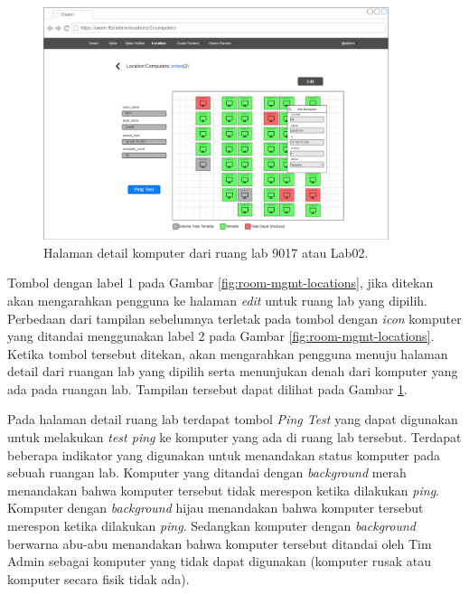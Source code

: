 \documentclass[a4paper,twoside]{article}
\begin{document}
\begin{enumerate}
\begin{itemize}
\begin{itemize}
                
                 \begin{figure}[ht]
                    \centering
                    \includegraphics[width=0.9\textwidth]{images/ui designs/room-management/location-id2.png}
                    \caption{Halaman detail komputer dari ruang lab 9017 atau Lab02.}
                    \label{fig:room-mgmt-detail-computers}
                \end{figure}
                
                 Tombol dengan label 1 pada Gambar \ref{fig:room-mgmt-locations}, jika ditekan akan mengarahkan pengguna ke halaman \textit{edit} untuk ruang lab yang dipilih. Perbedaan dari tampilan sebelumnya terletak pada tombol dengan \textit{icon} komputer yang ditandai menggunakan label 2 pada Gambar \ref{fig:room-mgmt-locations}. Ketika tombol tersebut ditekan, akan mengarahkan pengguna menuju halaman detail dari ruangan lab yang dipilih serta menunjukan denah dari komputer yang ada pada ruangan lab. Tampilan tersebut dapat dilihat pada Gambar \ref{fig:room-mgmt-detail-computers}.
                
                Pada halaman detail ruang lab terdapat tombol \textit{Ping Test} yang dapat digunakan untuk melakukan \textit{test ping} ke komputer yang ada di ruang lab tersebut. Terdapat beberapa indikator yang digunakan untuk menandakan status komputer pada sebuah ruangan lab. Komputer yang ditandai dengan \textit{background} merah menandakan bahwa komputer tersebut tidak merespon ketika dilakukan \textit{ping}. Komputer dengan \textit{background} hijau menandakan bahwa komputer tersebut merespon ketika dilakukan \textit{ping}. Sedangkan komputer dengan \textit{background} berwarna abu-abu menandakan bahwa komputer tersebut ditandai oleh Tim Admin sebagai komputer yang tidak dapat digunakan (komputer rusak atau komputer secara fisik tidak ada).
                

\end{itemize}
\end{itemize}
\end{enumerate}
\end{document}
